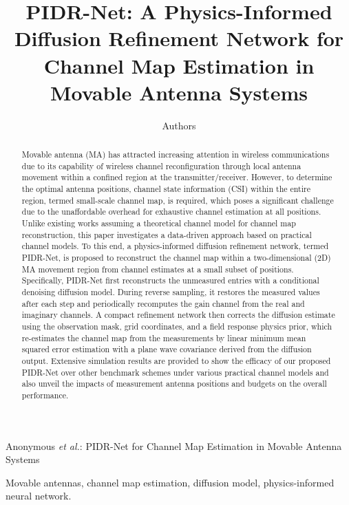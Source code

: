 \documentclass[lettersize,journal]{IEEEtran}
\begin{document}
\title{PIDR-Net: A Physics-Informed Diffusion Refinement Network for Channel Map Estimation in Movable Antenna Systems}

\author{Authors}

%
{Anonymous \MakeLowercase{\textit{et al.}}: PIDR-Net for Channel Map Estimation in Movable Antenna Systems}

\maketitle

\begin{abstract}
Movable antenna (MA) has attracted increasing attention in wireless communications due to its capability of wireless channel reconfiguration through local antenna movement within a confined region at the transmitter/receiver. However, to determine the optimal antenna positions, channel state information (CSI) within the entire region, termed small-scale channel map, is required, which poses a significant challenge due to the unaffordable overhead for exhaustive channel estimation at all positions. Unlike existing works assuming a theoretical channel model for channel map reconstruction, this paper investigates a data-driven approach based on practical channel models. To this end, a physics-informed diffusion refinement network, termed PIDR-Net, is proposed to reconstruct the channel map within a two-dimensional (2D) MA movement region from channel estimates at a small subset of positions. Specifically, PIDR-Net first reconstructs the unmeasured entries with a conditional denoising diffusion model. During reverse sampling, it restores the measured values after each step and periodically recomputes the gain channel from the real and imaginary channels. A compact refinement network then corrects the diffusion estimate using the observation mask, grid coordinates, and a field response physics prior, which re-estimates the channel map from the measurements by linear minimum mean squared error estimation with a plane wave covariance derived from the diffusion output. Extensive simulation results are provided to show the efficacy of our proposed PIDR-Net over other benchmark schemes under various practical channel models and also unveil the impacts of measurement antenna positions and budgets on the overall performance.
\end{abstract}

\begin{IEEEkeywords}
Movable antennas, channel map estimation, diffusion model, physics-informed neural network.
\end{IEEEkeywords}
\end{document}
